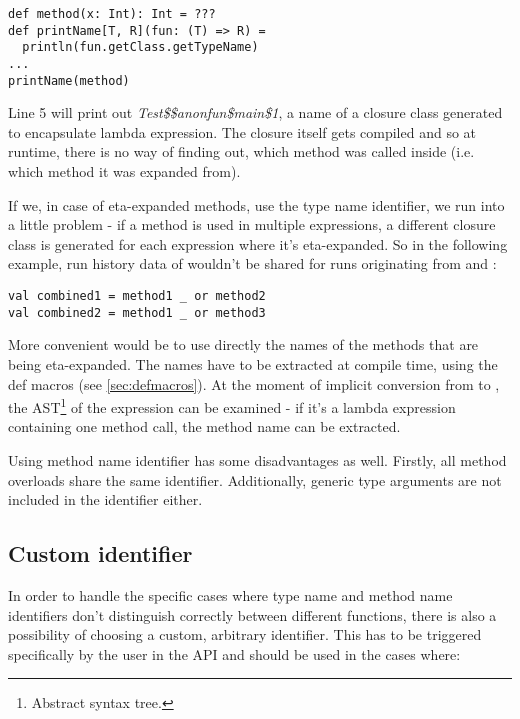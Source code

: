\lstset{style=Scala}
\begin{lstlisting}
def method(x: Int): Int = ???
def printName[T, R](fun: (T) => R) =
  println(fun.getClass.getTypeName)
...
printName(method)
\end{lstlisting}

Line 5 will print out \textit{Test\$\$anonfun\$main\$1}, a name of a closure class generated to encapsulate lambda expression. The closure itself gets compiled and so at runtime, there is no way of finding out, which method was called inside (i.e. which method it was expanded from).

If we, in case of eta-expanded methods, use the type name identifier, we run into a little problem - if a method is used in multiple  expressions, a different closure class is generated for each expression where it's eta-expanded. So in the following example, run history data of  wouldn't be shared for runs originating from  and :

\lstset{style=Scala}
\begin{lstlisting}
val combined1 = method1 _ or method2
val combined2 = method1 _ or method3
\end{lstlisting}

More convenient would be to use directly the names of the methods that are being eta-expanded. The names have to be extracted at compile time, using the def macros (see \ref{sec:defmacros}). At the moment of implicit conversion from  to , the AST\footnote{Abstract syntax tree.} of the  expression can be examined - if it's a lambda expression containing one method call, the method name can be extracted.

Using method name identifier has some disadvantages as well. Firstly, all method overloads share the same identifier. Additionally, generic type arguments are not included in the identifier either.

\subsection{Custom identifier}

In order to handle the specific cases where type name and method name identifiers don't distinguish correctly between different functions, there is also a possibility of choosing a custom, arbitrary identifier. This has to be triggered specifically by the user in the API and should be used in the cases where:

